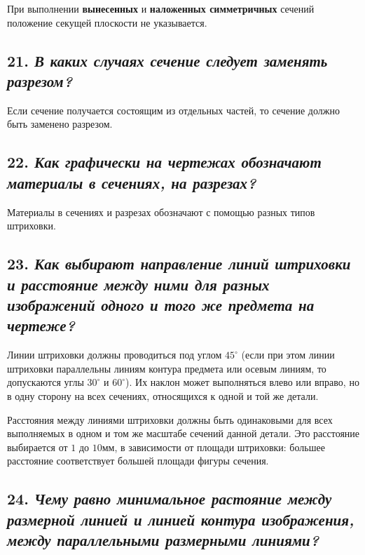При выполнении \textbf{вынесенных} и \textbf{наложенных симметричных} сечений положение секущей плоскости не указывается.
\subsection*{21. \textit{В каких случаях сечение следует заменять разрезом?}}

Если сечение получается состоящим из отдельных частей, то сечение должно быть заменено разрезом.



\subsection*{22. \textit{Как графически на чертежах обозначают материалы в сечениях, на разрезах?}}

Материалы в сечениях и разрезах обозначают с помощью разных типов штриховки.



\subsection*{23. \textit{Как выбирают направление линий штриховки и расстояние между ними для разных изображений одного и того же предмета на чертеже?}}

Линии штриховки должны проводиться под углом $45^{\circ}$ (если при этом линии штриховки параллельны линиям контура предмета или осевым линиям, то допускаются углы $30^{\circ}$ и $60^{\circ}$). Их наклон может выполняться влево или вправо, но в одну сторону на всех сечениях, относящихся к одной и той же детали.

Расстояния между линиями штриховки должны быть одинаковыми для всех выполняемых в одном и том же масштабе сечений данной детали. Это расстояние выбирается от $1$ до $10 \text{мм}$, в зависимости от площади штриховки: большее расстояние соответствует большей площади фигуры сечения.
\subsection*{24. \textit{Чему равно минимальное растояние между размерной линией и линией контура изображения, между параллельными размерными линиями?}}

